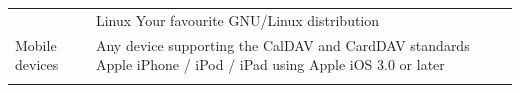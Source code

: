 \documentclass[]{article}
\begin{document}
\begin{longtable}[c]{@{}ll@{}}
\\\noalign{\medskip}
\begin{minipage}[t]{0.19\columnwidth}\raggedright
\end{minipage} & \begin{minipage}[t]{0.81\columnwidth}\raggedright
Linux Your favourite GNU/Linux distribution
\end{minipage}
\\\noalign{\medskip}
\begin{minipage}[t]{0.19\columnwidth}\raggedright
Mobile devices
\end{minipage} & \begin{minipage}[t]{0.81\columnwidth}\raggedright
Any device supporting the CalDAV and CardDAV standards Apple iPhone /
iPod / iPad using Apple iOS 3.0 or later
\end{minipage}
\\\noalign{\medskip}
\hline
\end{longtable}
\end{document}
